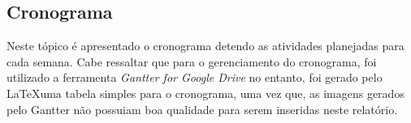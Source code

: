 \begin{landscape}
\chapter[Cronograma]{Cronograma}
\label{chap:cronograma}
	
	Neste tópico é apresentado o cronograma detendo as atividades planejadas para cada semana. Cabe ressaltar que para o gerenciamento do cronograma, foi utilizado a ferramenta \emph{Gantter for Google Drive} no entanto, foi gerado pelo \LaTeX uma tabela simples para o cronograma, uma vez que, as imagens gerados pelo Gantter não possuiam boa qualidade para serem inseridas neste relatório.
	

	\label{subsubsec:cronograma_table}
		\begin{table}[h]
			\centering
			\begin{tabular}{|p{7cm}|c|c|c|c|p{4cm}|c|}
				
				\hline
				

\end{tabular}
\end{table}
\end{landscape}

